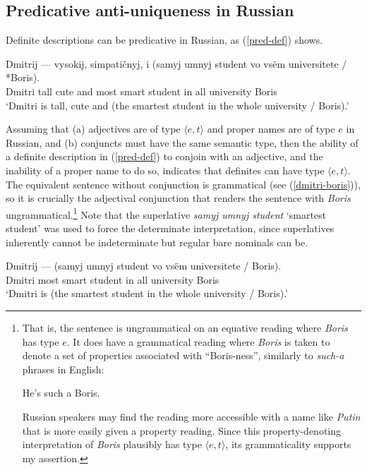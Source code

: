 \documentclass{article}
\begin{document}
\subsection{Predicative anti-uniqueness in Russian}
Definite descriptions can be predicative in Russian, as (\ref{pred-def}) shows.

\begin{exe}
	\ex \label{pred-def} \gll Dmitrij --- vysokij, simpati\v{c}nyj, i (samyj umnyj student vo vs\"{e}m universitete / *Boris).\\
	Dmitri {} tall cute and most smart student in all university {} Boris\\
	\glt `Dmitri is tall, cute and (the smartest student in the whole university / Boris).'
\end{exe}

Assuming that (a) adjectives are of type $\langle e, t \rangle$ and proper names are of type $e$ in Russian, and (b) conjuncts must have the same semantic type, then the ability of a definite description in (\ref{pred-def}) to conjoin with an adjective, and the inability of a proper name to do so, indicates that definites can have type $\langle e, t \rangle$. The equivalent sentence without conjunction is grammatical (see (\ref{dmitri-boris})), so it is crucially the adjectival conjunction that renders the sentence with \textit{Boris} ungrammatical.\footnote{That is, the sentence is ungrammatical on an equative reading where \textit{Boris} has type $e$. It does have a grammatical reading where \textit{Boris} is taken to denote a set of properties associated with ``Boris-ness'', similarly to \textit{such-a} phrases in English: \begin{exe} \ex He's such a Boris.\end{exe} Russian speakers may find the reading more accessible with a name like \textit{Putin} that is more easily given a property reading. Since this property-denoting interpretation of \textit{Boris} plausibly has type $\langle e, t \rangle$, its grammaticality supports my assertion.} Note that the superlative \textit{samyj umnyj student} `smartest student' was used to force the determinate interpretation, since superlatives inherently cannot be indeterminate but regular bare nominals can be.

\begin{exe}
	\ex \label{dmitri-boris} \gll Dmitrij --- (samyj umnyj student vo vs\"{e}m universitete / Boris).\\
	Dmitri {} most smart student in all university {} Boris\\
	\glt `Dmitri is (the smartest student in the whole university / Boris).'
\end{exe}
\end{document}
